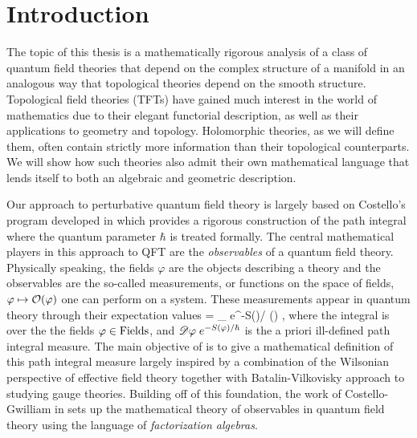 \chapter{Introduction}

The topic of this thesis is a mathematically rigorous analysis of a class of quantum field theories that depend on the complex structure of a manifold in an analogous way that topological theories depend on the smooth structure. 
Topological field theories (TFTs) have gained much interest in the world of mathematics due to their elegant functorial description, as well as their applications to geometry and topology. 
Holomorphic theories, as we will define them, often contain strictly more information than their topological counterparts.
We will show how such theories also admit their own mathematical language that lends itself to both an algebraic and geometric description. 

Our approach to perturbative quantum field theory is largely based on Costello's program developed in \cite{CostelloRenormalization} which provides a rigorous construction of the path integral where the quantum parameter $\hbar$ is treated formally. 
The central mathematical players in this approach to QFT are the {\em observables} of a quantum field theory. 
Physically speaking, the fields $\varphi$ are the objects describing a theory and the observables are the so-called measurements, or functions on the space of fields, $\varphi \mapsto \mathcal O(\varphi)$ one can perform on a system.
These measurements appear in quantum theory through their expectation values
\ben
\<\cO\> = \int_{\varphi {}} \sD \varphi \; e^{-S(\varphi)/ \hbar} \;  \cO(\varphi) ,
\een
where the integral is over the the fields $\varphi \in {\rm Fields}$, and $\mathscr D \varphi \; e^{-S(\varphi)/ \hbar}$ is the a priori ill-defined path integral measure.
The main objective of \cite{CostelloRenormalization} is to give a mathematical definition of this path integral measure largely inspired by a combination of the Wilsonian perspective of effective field theory together with Batalin-Vilkovisky approach to studying gauge theories.
Building off of this foundation, the work of Costello-Gwilliam in \cite{CG1,CG2} sets up the mathematical theory of observables in quantum field theory using the language of {\em factorization algebras}. 

